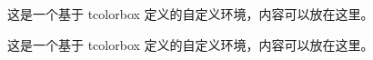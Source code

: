 \documentclass{article}
\begin{document}
\begin{mybox}[title=我的标题]
    这是一个基于 tcolorbox 定义的自定义环境，内容可以放在这里。
\end{mybox}

\begin{mybox}
  这是一个基于 tcolorbox 定义的自定义环境，内容可以放在这里。
\end{mybox}
\end{document}
